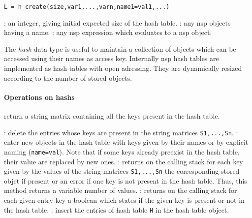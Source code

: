 
\begin{mandesc}
\end{mandesc}

\begin{calling_sequence}
\begin{verbatim}
L = h_create(size,var1,...,varn,name1=val1,...)
\end{verbatim}
\end{calling_sequence}
\begin{parameters}
  \begin{varlist}
    : an integer, giving initial expected size of the hash table.
    :  any nsp objects having a name. 
    : any nsp expression which evaluates to a nsp object.
  \end{varlist}
\end{parameters}

\begin{mandescription}
The \emph{hash} data type is useful to maintain a collection of objects 
which can be accessed using their names as access key. 
Internally nsp hash tables are implemented as hash tables with open adressing. 
They are dynamically resized according to the number of stored objects. 
\end{mandescription}

\paragraph{Operations on hashs}
  \begin{varlist}
     return a string matrix containing all the keys present in the hash 
    table.
  \end{varlist}

  \begin{varlist}
  : delete the entries whose keys are present in the string matrices 
  \verb+S1,...,Sn+.
  : enter new objects in the hash table with keys 
  given by their names or by explicit naming (\verb+name=val+). Note that if some keys 
  already preexist in the hash table, their value are replaced by new ones. 
  : returns on the calling stack for each key given by the values of 
  the string matrices \verb+S1,...,Sn+ the corresponding stored objet if present or an 
  error if one key is not present in the hash table. Thus, this method returns a variable 
  number of values. 
  : returns on the calling stack for each given entry key a boolean 
  which states if the given key is present or not in the hash table.
  : insert the entries of hash table \verb+H+ in the hash table object.
  \end{varlist}

